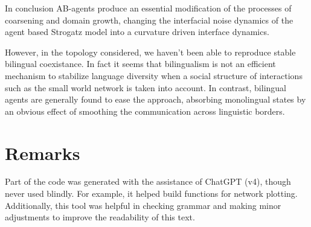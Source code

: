 In conclusion AB-agents produce an essential modification of the processes of coarsening and domain growth, changing the interfacial noise dynamics of the agent based Strogatz model into a curvature driven interface dynamics.

However, in the topology considered, we haven't been able to reproduce stable bilingual coexistance. In fact it seems that bilingualism is not an efficient mechanism to stabilize language diversity when a social structure of interactions such as the small world network is taken into account. In contrast, bilingual agents are generally found to ease the approach, absorbing monolingual states by an obvious effect of smoothing the communication across linguistic borders.

\chapter*{Remarks}
Part of the code was generated with the assistance of ChatGPT (v4), though never used blindly. For example, it helped build functions for network plotting. Additionally, this tool was helpful in checking grammar and making minor adjustments to improve the readability of this text.

